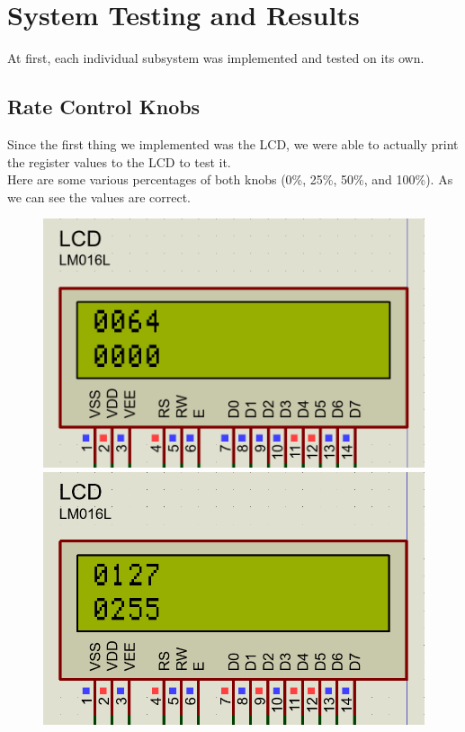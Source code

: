 \documentclass[a4paper, 12pt]{article}
\begin{document}
\newpage

\section{System Testing and Results}
At first, each individual subsystem was implemented and tested on its own. \\

\subsection{Rate Control Knobs}

Since the first thing we implemented was the LCD, we were able to actually print the register values to the LCD to test it. \\

Here are some various percentages of both knobs (0\%, 25\%, 50\%, and 100\%). As we can see the values are correct. \\

\begin{figure}[H]
\centering
\begin{minipage}{.5\textwidth}
  \centering
  \includegraphics[width=0.95\linewidth]{images/ADC_Test1}
\end{minipage}%
\begin{minipage}{.5\textwidth}
  \centering
  \includegraphics[width=0.95\linewidth]{images/ADC_Test2}
\end{minipage}
\end{figure}
\end{document}
